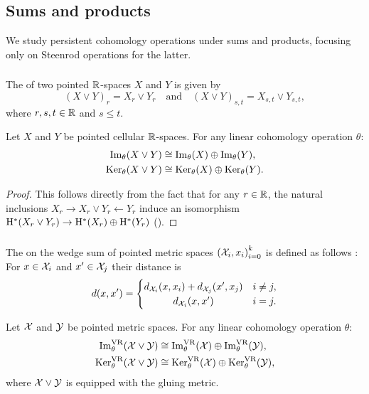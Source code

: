 
\subsection{Sums and products}\label{ss:sums_products}

We study persistent cohomology operations under sums and products, focusing only on Steenrod operations for the latter.

\subsubsection{}\label{ss:wedge_sum_general}

The  of two pointed \(\mathbb{R}\)-spaces \(X\) and \(Y\) is given by
\[
(X \vee Y)_r = X_r \vee Y_r \quad\text{and}\quad (X \vee Y)_{s,t} = X_{s,t} \vee Y_{s,t},
\]
where \(r, s, t \in \mathbb{R}\) and \(s \leq t\).

\lemma
Let $X$ and $Y$ be pointed cellular $\mathbb{R}$-spaces.
For any linear cohomology operation $\theta$:
\begin{align*}
	\operatorname{Im}_\theta(X \vee Y) &\cong \operatorname{Im}_\theta(X) \oplus \operatorname{Im}_\theta(Y), \\
	\operatorname{Ker}_\theta(X \vee Y) &\cong \operatorname{Ker}_\theta(X) \oplus \operatorname{Ker}_\theta(Y).
\end{align*}

\begin{proof}
	This follows directly from the fact that for any \(r \in \mathbb{R}\), the natural inclusions $X_r \to X_r \vee Y_r \leftarrow Y_r$ induce an isomorphism $\mathrm{H}^*(X_r \vee Y_r) \to \mathrm{H}^*(X_r) \oplus \mathrm{H}^*(Y_r)$ (\cite[Cor.~2.25.]{hatcher2000}).
\end{proof}

\subsubsection{}\label{ss:wedge sum}

The  on the wedge sum of pointed metric spaces ${(\mathcal{X}_i, x_i)}_{i = 0}^k$ is defined as follows \cite{burago2001course}: For $x \in \mathcal{X}_i$ and $x' \in \mathcal{X}_j$ their distance is
\[
d(x, x') =
\begin{cases}
	d_{\cX_i}(x, x_i) + d_{\cX_j}(x', x_j) & i \neq j, \\
	\hfil d_{\cX_i}(x, x') & i = j.
\end{cases}
\]

\theorem
Let $\mathcal{X}$ and $\mathcal{Y}$ be pointed metric spaces.
For any linear cohomology operation $\theta$:
\begin{align*}
	\operatorname{Im}_\theta^{\mathrm{VR}}(\mathcal{X} \vee \mathcal{Y}) &\cong \operatorname{Im}_\theta^{\mathrm{VR}}(\mathcal{X}) \oplus \operatorname{Im}_\theta^{\mathrm{VR}}(\mathcal{Y}), \\
	\operatorname{Ker}_\theta^{\mathrm{VR}}(\mathcal{X} \vee \mathcal{Y}) &\cong \operatorname{Ker}_\theta^{\mathrm{VR}}(\mathcal{X}) \oplus \operatorname{Ker}_\theta^{\mathrm{VR}}(\mathcal{Y}),
\end{align*}
where \(\mathcal{X} \vee \mathcal{Y}\) is equipped with the gluing metric.

